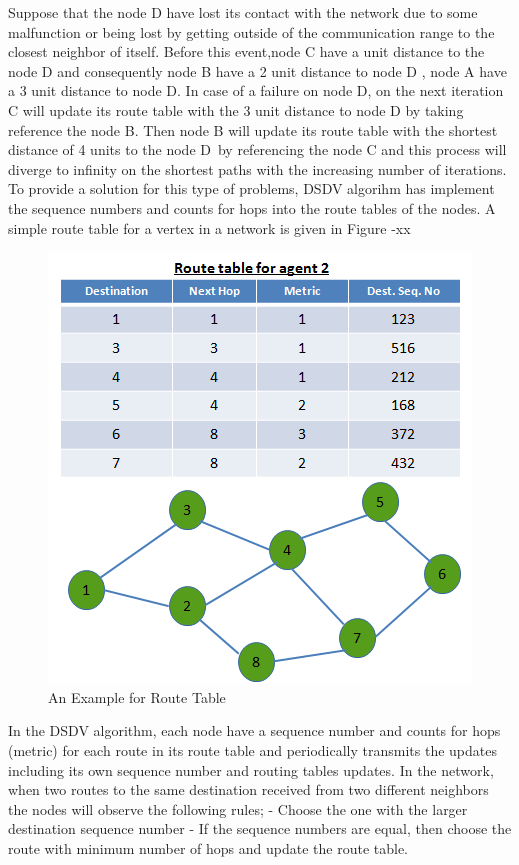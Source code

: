 Suppose that the node D have lost its contact with the network due to some malfunction or being lost by getting outside of the communication range to the closest neighbor of itself. Before this event,node C have a unit distance to the node D and consequently node B have a 2 unit distance to node D , node A have a 3 unit distance to node D. In case of a failure on node D, on the next iteration C will update its route table with the 3 unit distance to node D by taking reference the node B. Then node B will update its route table with the shortest distance of 4 units to the node D\ by referencing the node C and this process will diverge to infinity on the shortest paths with the increasing number of iterations. To provide a solution for this type of problems, DSDV algorihm has implement the sequence numbers and counts for hops into the route tables of the nodes. A simple route table for a vertex in a network is given in Figure -xx

\begin{figure}[H]
\caption{An Example for Route Table}
\centering
\includegraphics[scale = 0.65]{dest_seq}
\end{figure}

In the DSDV algorithm, each node have a sequence number and counts for hops (metric) for each route in its route table and periodically transmits the updates including its own sequence number and routing tables updates. In the network, when two routes to the same destination received from two different neighbors the nodes will observe the following rules;	
	- Choose the one with the larger destination sequence number
	- If the sequence numbers are equal, then choose the route with minimum number of hops and update the route table.
	
